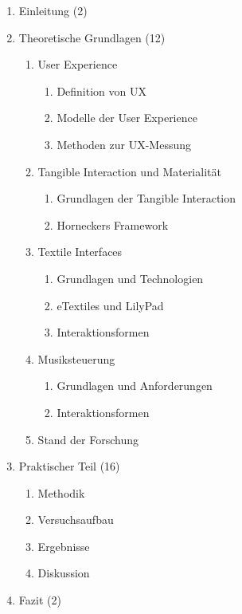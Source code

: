 \documentclass[12pt, a4paper]{article}
\begin{document}
\begin{enumerate}
    \item Einleitung (2)
    \item Theoretische Grundlagen (12)
    \begin{enumerate}
        \item User Experience
        \begin{enumerate}
            \item Definition von UX
            \item Modelle der User Experience
            \item Methoden zur UX-Messung
        \end{enumerate}
        \item Tangible Interaction und Materialität
        \begin{enumerate}
            \item Grundlagen der Tangible Interaction
            \item Horneckers Framework
        \end{enumerate}
        \item Textile Interfaces
        \begin{enumerate}
            \item Grundlagen und Technologien
            \item eTextiles und LilyPad
            \item Interaktionsformen
        \end{enumerate}
        \item Musiksteuerung
        \begin{enumerate}
            \item Grundlagen und Anforderungen
            \item Interaktionsformen
        \end{enumerate}
        \item Stand der Forschung
    \end{enumerate}
    \item Praktischer Teil (16)
    \begin{enumerate}
        \item Methodik
        \item Versuchsaufbau
        \item Ergebnisse
        \item Diskussion
    \end{enumerate}
    \item Fazit (2)
\end{enumerate}
\end{document}
